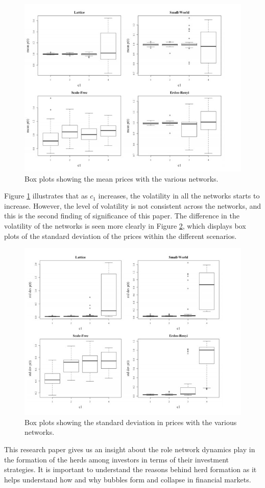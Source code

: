 \documentclass[runningheads]{llncs}
\begin{document}
\begin{figure}[H]
\includegraphics[width=\textwidth]{Fig7.jpg}
\caption{Box plots showing the mean prices with the various networks.} \label{fig3}
\end{figure}
Figure \ref{fig3} illustrates that as $c_1$ increases, the volatility in all the networks starts to increase. However, the level of volatility is not consistent across the networks, and this is the second finding of significance of this paper. The difference in the volatility of the networks is seen more clearly in Figure \ref{fig4}, which displays box plots of the standard deviation of the prices within the different scenarios.
\begin{figure}[H]
\includegraphics[width=\textwidth]{Fig8.jpg}
\caption{Box plots showing the standard deviation in prices with the various networks.} \label{fig4}
\end{figure}
This research paper gives us an insight about the role network dynamics play in the formation of the herds among investors in terms of their investment strategies. It is important to understand the reasons behind herd formation as it helps understand how and why bubbles form and collapse in financial markets.
\end{document}
